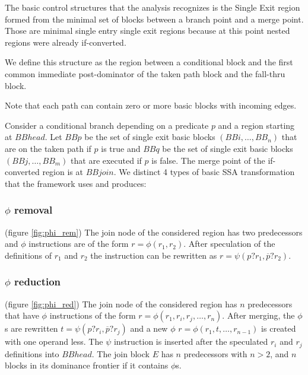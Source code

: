 The basic control structures that the analysis recognizes is the Single Exit region formed from the minimal set of blocks between a branch point and a merge point.  Those are minimal single entry single exit regions because at this point nested regions were already if-converted.

 We define this structure as the region between a conditional block and the first common immediate post-dominator of the taken path block and the fall-thru block.

Note that each path can contain zero or more basic blocks with incoming edges.

Consider a conditional branch depending on a predicate $p$ and a region starting at $BBhead$. Let $BBp$ be the set of single exit basic blocks $(BBi,\dots,BB_n)$ that are on the taken path if $p$ is true and $BBq$ be the set of single exit basic blocks $(BBj,\dots,BB_m)$ that are executed if $p$ is false. The merge point of the if-converted region is at $BBjoin$. We distinct 4 types of basic SSA transformation that the framework uses and produces:
\subsubsection{$\phi$ removal} (figure \ref{fig:phi_rem})
The join node of the considered region has two predecessors and $\phi$ instructions are of the form $r=\phi(r_1,r_2)$. After speculation of the definitions of $r_1$ and $r_2$ the instruction can be rewritten as $r=\psi(p?r_1,\overline{p}?r_2)$.
\subsubsection{$\phi$ reduction} (figure \ref{fig:phi_red})
 The join node of the considered region has $n$ predecessors that have $\phi$ instructions of the form $r=\phi(r_1,r_i,r_j,\dots,r_n)$. After merging, the $\phi$s are rewritten $t=\psi(p?r_i,\overline{p}?r_j)$ and a new $\phi$ $r=\phi(r_1,t,\dots,r_{n-1})$ is created with one operand less. The $\psi$ instruction is inserted after the speculated $r_i$ and $r_j$ definitions into $BBhead$.
The join block $E$ has $n$ predecessors with $n > 2$, and $n$ blocks in its dominance frontier if it contains $\phi$s.
